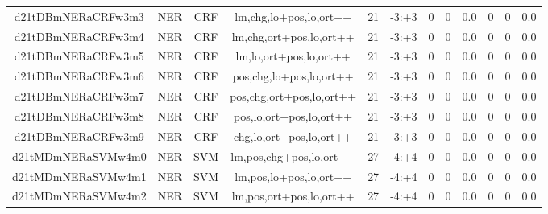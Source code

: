 \documentclass[a4paper]{article}
\begin{document}
\begin{landscape}
\begin{center}
\begin{tabular}{ |c|c|c|c|c|c|c|c|c|c|c|c|}
 
 	
 	\small{ d21tDBmNERaCRFw3m3 } & \small{ NER} & \small{  CRF }  & lm,chg,lo+pos,lo,ort++  &  21 &  \small{  -3:+3 }  &  0 & 0 & 0.0  &  0 & 0 & 0.0 \\
 	

 
 	
 	\small{ d21tDBmNERaCRFw3m4 } & \small{ NER} & \small{  CRF }  & lm,chg,ort+pos,lo,ort++  &  21 &  \small{  -3:+3 }  &  0 & 0 & 0.0  &  0 & 0 & 0.0 \\
 	

 
 	
 	\small{ d21tDBmNERaCRFw3m5 } & \small{ NER} & \small{  CRF }  & lm,lo,ort+pos,lo,ort++  &  21 &  \small{  -3:+3 }  &  0 & 0 & 0.0  &  0 & 0 & 0.0 \\
 	

 
 	
 	\small{ d21tDBmNERaCRFw3m6 } & \small{ NER} & \small{  CRF }  & pos,chg,lo+pos,lo,ort++  &  21 &  \small{  -3:+3 }  &  0 & 0 & 0.0  &  0 & 0 & 0.0 \\
 	

 
 	
 	\small{ d21tDBmNERaCRFw3m7 } & \small{ NER} & \small{  CRF }  & pos,chg,ort+pos,lo,ort++  &  21 &  \small{  -3:+3 }  &  0 & 0 & 0.0  &  0 & 0 & 0.0 \\
 	

 
 	
 	\small{ d21tDBmNERaCRFw3m8 } & \small{ NER} & \small{  CRF }  & pos,lo,ort+pos,lo,ort++  &  21 &  \small{  -3:+3 }  &  0 & 0 & 0.0  &  0 & 0 & 0.0 \\
 	

 
 	
 	\small{ d21tDBmNERaCRFw3m9 } & \small{ NER} & \small{  CRF }  & chg,lo,ort+pos,lo,ort++  &  21 &  \small{  -3:+3 }  &  0 & 0 & 0.0  &  0 & 0 & 0.0 \\
 	

 
 	
 	\small{ d21tMDmNERaSVMw4m0 } & \small{ NER} & \small{  SVM }  & lm,pos,chg+pos,lo,ort++  &  27 &  \small{  -4:+4 }  &  0 & 0 & 0.0  &  0 & 0 & 0.0 \\
 	

 
 	
 	\small{ d21tMDmNERaSVMw4m1 } & \small{ NER} & \small{  SVM }  & lm,pos,lo+pos,lo,ort++  &  27 &  \small{  -4:+4 }  &  0 & 0 & 0.0  &  0 & 0 & 0.0 \\
 	

 
 	
 	\small{ d21tMDmNERaSVMw4m2 } & \small{ NER} & \small{  SVM }  & lm,pos,ort+pos,lo,ort++  &  27 &  \small{  -4:+4 }  &  0 & 0 & 0.0  &  0 & 0 & 0.0 \\
 	


\end{tabular}
\end{center}
\end{landscape}
\end{document}
